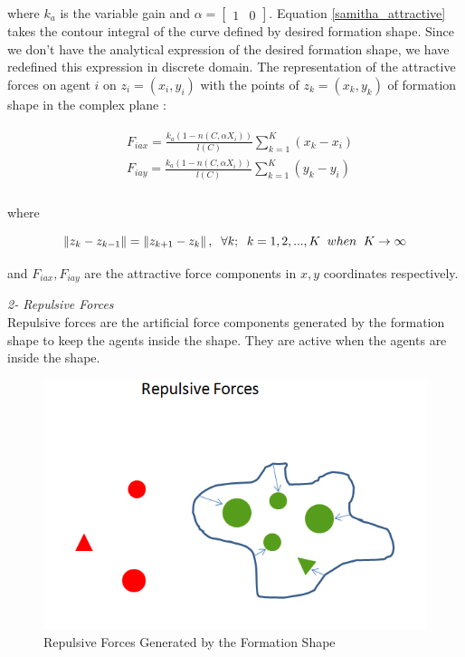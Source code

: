 where $k_a$ is the variable gain and $\alpha = \begin{bmatrix}
1 & 0
		\end{bmatrix}$. Equation \ref{samitha_attractive} takes the contour integral of the curve defined by desired formation shape. Since we don't have the analytical expression of the desired formation shape, we have redefined this expression in discrete domain. The representation of the attractive forces on agent $i$ on $z_i = (x_i, y_i)$ with the points of  $z_k = (x_k,y_k)$ of formation shape in the complex plane \cite{17}:

\begin{align}
\begin{split}
& F_{iax} =\frac{k_a (1-n(C,\alpha X_i))}{l(C)}  \sum_{k=1}^{K} (x_k  - x_i)\\
& F_{iay} =\frac{k_a (1-n(C,\alpha X_i))}{l(C)}  \sum_{k=1}^{K} (y_k  - y_i)\\
\end{split}
\end{align}
			
where

\begin{equation}
\left\lVert z_k - z_{k-1}\right\rVert = \left\lVert z_{k+1} - z_k\right\rVert, \hspace{0.2cm}  \forall k ;  \hspace{0.2cm} k=1,2,...,K \hspace{0.2cm} when  \hspace{0.2cm} K \to\infty
\end{equation}
			
and $F_{iax} , F_{iay} $ are the attractive force components in $x,y$ coordinates respectively.\newline
			
\textit{	2- Repulsive Forces} \\ 
Repulsive forces are the artificial force components generated by the formation shape to keep the agents inside the shape. They are active when the agents are inside the shape. 
					
\begin{figure}[H]
\caption{Repulsive Forces Generated by the Formation Shape}
\centering
\includegraphics[scale = 0.60]{repulsive_forces}
\end{figure}
							
